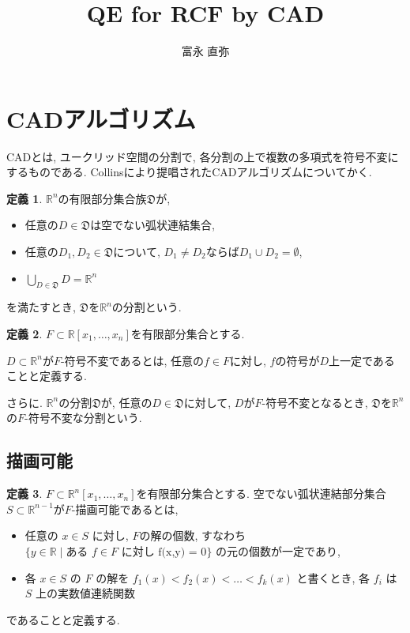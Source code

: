 \documentclass[dvipdfmx,uplatex]{jsarticle}
\newcommand{\R}{\mathbb{R}}
\theoremstyle{definition}
\newtheorem{definition}{定義}[section]
\begin{document}
\title{QE for RCF by CAD}
\author{富永 直弥}
\maketitle

\section{CADアルゴリズム}
CADとは, ユークリッド空間の分割で, 各分割の上で複数の多項式を符号不変にするものである. Collinsにより提唱されたCADアルゴリズムについてかく. 
\begin{definition}
$\R^n$の有限部分集合族$\mathfrak{D}$が, 

\begin{itemize}
	\item 任意の$D \in \mathfrak{D}$は空でない弧状連結集合, 
	\item 任意の$D_1, D_2 \in \mathfrak{D}$について, $D_1 \neq D_2$ならば$D_1 \cup D_2 = \emptyset$,
	\item $\bigcup_{D \in \mathfrak{D}}D = \R^n$
\end{itemize}

を満たすとき, $\mathfrak{D}$を$\R^n$の分割という.
\end{definition}

\begin{definition}
$F \subset \R[x_1, \dots, x_n]$を有限部分集合とする.

$D \subset \R^n$が$F$-符号不変であるとは, 任意の$f \in F$に対し, $f$の符号が$D$上一定であることと定義する.

さらに. $\R^n$の分割$\mathfrak{D}$が, 任意の$D \in \mathfrak{D}$に対して, $D$が$F$-符号不変となるとき, $\mathfrak{D}$を$\R^n$の$F$-符号不変な分割という.
\end{definition}

\subsection{描画可能}
\begin{definition}
$F \subset \R^n[x_1, \dots, x_n]$を有限部分集合とする. 空でない弧状連結部分集合$S \subset \R^{n-1}$が$F$-描画可能であるとは, 
\begin{itemize}
	\item 任意の $ x \in S $ に対し, $ F $の解の個数, すなわち $ \{y \in \mathbb{R} \mid \text{ある $f \in F$ に対し f(x,y) = 0} \} $ の元の個数が一定であり, 
	\item 各 $ x \in S $ の $ F $ の解を $ f_1(x) < f_2(x) < \dots < f_k(x) $ と書くとき, 各 $ f_i $ は $ S $ 上の実数値連続関数
\end{itemize}
であることと定義する.
\end{definition}
\end{document}
